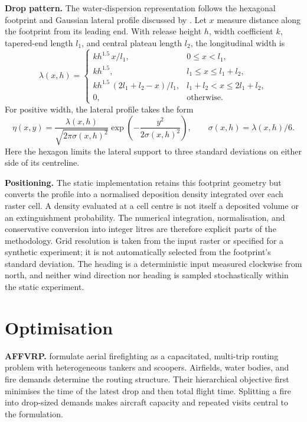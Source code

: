 \textbf{Drop pattern.} The water-dispersion representation follows the hexagonal footprint and Gaussian lateral profile discussed by \citet{liu2025hierarchical}. Let $x$ measure distance along the footprint from its leading end. With release height $h$, width coefficient $k$, tapered-end length $l_1$, and central plateau length $l_2$, the longitudinal width is
\begin{equation}
    \lambda(x,h) =
    \begin{cases}
        k h^{1.5}\,x/l_1, & 0 \leq x < l_1, \\[3pt]
        k h^{1.5}, & l_1 \leq x \leq l_1+l_2, \\[3pt]
        k h^{1.5}\,(2l_1+l_2-x)/l_1, & l_1+l_2 < x \leq 2l_1+l_2, \\[3pt]
        0, & \text{otherwise}.
    \end{cases}
\end{equation}
For positive width, the lateral profile takes the form
\begin{equation}
    \eta(x,y) = \frac{\lambda(x,h)}{\sqrt{2\pi\sigma(x,h)^2}}
    \exp\!\left(-\frac{y^2}{2\sigma(x,h)^2}\right),
    \qquad \sigma(x,h)=\lambda(x,h)/6.
\end{equation}
Here the hexagon limits the lateral support to three standard deviations on either side of its centreline.

\textbf{Positioning.} The static implementation retains this footprint geometry but converts the profile into a normalised deposition density integrated over each raster cell. A density evaluated at a cell centre is not itself a deposited volume or an extinguishment probability. The numerical integration, normalisation, and conservative conversion into integer litres are therefore explicit parts of the methodology. Grid resolution is taken from the input raster or specified for a synthetic experiment; it is not automatically selected from the footprint's standard deviation. The heading is a deterministic input measured clockwise from north, and neither wind direction nor heading is sampled stochastically within the static experiment.

\section{Optimisation}
\label{sec:lit-optimisation}

\textbf{AFFVRP.} \citet{chalabi2024affvrp} formulate aerial firefighting as a capacitated, multi-trip routing problem with heterogeneous tankers and scoopers. Airfields, water bodies, and fire demands determine the routing structure. Their hierarchical objective first minimises the time of the latest drop and then total flight time. Splitting a fire into drop-sized demands makes aircraft capacity and repeated visits central to the formulation.

